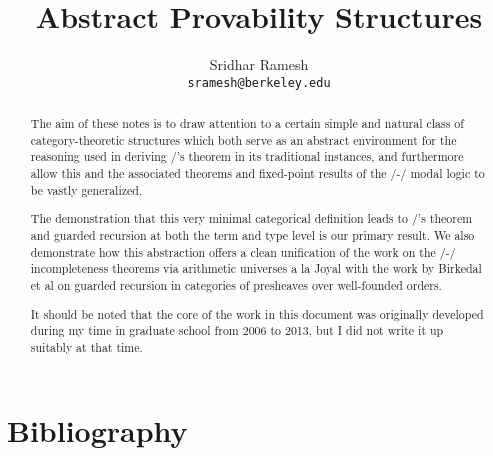 \documentclass[12pt]{article}
\title{Abstract Provability Structures}
\author{
  Sridhar Ramesh\\
  \texttt{sramesh@berkeley.edu}
}
\begin{document}
\maketitle

\begin{abstract}

The aim of these notes is to draw attention to a certain simple and natural class of category-theoretic structures which both serve as an abstract environment for the reasoning used in deriving \Loeb/'s theorem in its traditional instances, and furthermore allow this and the associated theorems and fixed-point results of the \Goedel/-\Loeb/ modal logic to be vastly generalized.

The demonstration that this very minimal categorical definition leads to \Loeb/'s theorem and guarded recursion at both the term and type level is our primary result. We also demonstrate how this abstraction offers a clean unification of the work on the \Godel/-\Lob/ incompleteness theorems via arithmetic universes a la Joyal with the work by Birkedal et al on guarded recursion in categories of presheaves over well-founded orders.

It should be noted that the core of the work in this document was originally developed during my time in graduate school from 2006 to 2013, but I did not write it up suitably at that time.
\end{abstract}

\newpage
\tableofcontents

\newpage
\setcounter{section}{-1}
\setcounter{page}{1}













\newpage
\section{Bibliography}
\printbibliography

\printindex
\end{document}
